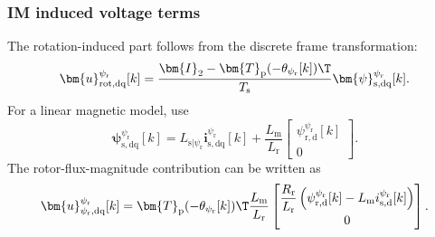 \begin{frame}
	\frametitle{IM induced voltage terms}
	The rotation-induced part follows from the discrete frame transformation:
	\begin{equation*}
		\bm{u}_{\mathrm{rot},\mathrm{dq}}^{\psi_{\mathrm{r}}}[k]
		=\frac{\bm{I}_2-\bm{T}_{\mathrm{p}}(-\theta_{\psi_{\mathrm{r}}}[k])\T}{T_{\mathrm{s}}}
		\bm{\psi}_{\mathrm{s},\mathrm{dq}}^{\psi_{\mathrm{r}}}[k].
	\end{equation*}\pause%
	For a linear magnetic model, use
	\begin{equation*}
		\bm{\psi}_{\mathrm{s},\mathrm{dq}}^{\psi_{\mathrm{r}}}[k]
		=L_{\mathrm{s}|\psi_{\mathrm{r}}}\bm{i}_{\mathrm{s},\mathrm{dq}}^{\psi_{\mathrm{r}}}[k]
		+\frac{L_{\mathrm{m}}}{L_{\mathrm{r}}}
		\begin{bmatrix}\psi_{\mathrm{r},\mathrm{d}}^{\psi_{\mathrm{r}}}[k]\\0\end{bmatrix}.
	\end{equation*}\pause%
	The rotor-flux-magnitude contribution can be written as
	\begin{equation*}
		\bm{u}_{\psi_{\mathrm{r}},\mathrm{dq}}^{\psi_{\mathrm{r}}}[k]
		=\bm{T}_{\mathrm{p}}(-\theta_{\psi_{\mathrm{r}}}[k])\T
		\frac{L_{\mathrm{m}}}{L_{\mathrm{r}}}
		\begin{bmatrix}
			\dfrac{R_{\mathrm{r}}}{L_{\mathrm{r}}}
			\left(\psi_{\mathrm{r},\mathrm{d}}^{\psi_{\mathrm{r}}}[k]
			-L_{\mathrm{m}}i_{\mathrm{s},\mathrm{d}}^{\psi_{\mathrm{r}}}[k]\right) \\[2mm]
			0
		\end{bmatrix}.
	\end{equation*}
\end{frame}

